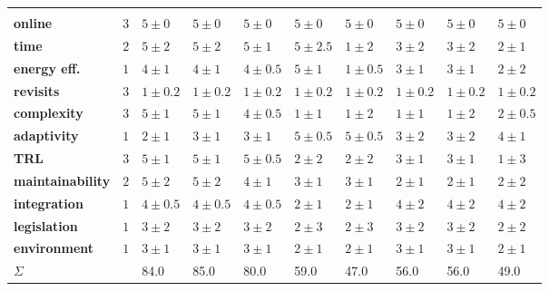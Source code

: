 {
\noindent
{}
\begin{tabu}{X[7,r,m] X[1,cm] X[3,c,m] X[3,c,m] X[3,c,m] X[3,c,m] X[3,c,m] X[3,c,m] X[3,c,m] X[3,c,m]}
 \rowfont{\sffamily\bfseries\color{RoyalWhite}}
  \color{RoyalWhite} & \color{RoyalWhite}  & \color{RoyalWhite}  & \color{RoyalWhite}  & \color{RoyalWhite}  & \color{RoyalWhite}  & \color{RoyalWhite}  & \color{RoyalWhite}  & \color{RoyalWhite}  & \color{RoyalWhite} \\
  \textbf{online} & \(3\) & \(5 \pm 0\) & \(5 \pm 0\) & \(5 \pm 0\) & \(5 \pm 0\) & \(5 \pm 0\) & \(5 \pm 0\) & \(5 \pm 0\) & \(5 \pm 0\)\\
  \textbf{time} & \(2\) & \(5 \pm 2\) & \(5 \pm 2\) & \(5 \pm 1\) & \(5 \pm 2.5\) & \(1 \pm 2\) & \(3 \pm 2\) & \(3 \pm 2\) & \(2 \pm 1\)\\
  \textbf{energy eff.} & \(1\) & \(4 \pm 1\) & \(4 \pm 1\) & \(4 \pm 0.5\) & \(5 \pm 1\) & \(1 \pm 0.5\) & \(3 \pm 1\) & \(3 \pm 1\) & \(2 \pm 2\)\\
  \textbf{revisits} & \(3\) & \(1 \pm 0.2\) & \(1 \pm 0.2\) & \(1 \pm 0.2\) & \(1 \pm 0.2\) & \(1 \pm 0.2\) & \(1 \pm 0.2\) & \(1 \pm 0.2\) & \(1 \pm 0.2\)\\
  \textbf{complexity} & \(3\) & \(5 \pm 1\) & \(5 \pm 1\) & \(4 \pm 0.5\) & \(1 \pm 1\) & \(1 \pm 2\) & \(1 \pm 1\) & \(1 \pm 2\) & \(2 \pm 0.5\)\\
  \textbf{adaptivity} & \(1\) & \(2 \pm 1\) & \(3 \pm 1\) & \(3 \pm 1\) & \(5 \pm 0.5\) & \(5 \pm 0.5\) & \(3 \pm 2\) & \(3 \pm 2\) & \(4 \pm 1\)\\
  \textbf{TRL} & \(3\) & \(5 \pm 1\) & \(5 \pm 1\) & \(5 \pm 0.5\) & \(2 \pm 2\) & \(2 \pm 2\) & \(3 \pm 1\) & \(3 \pm 1\) & \(1 \pm 3\)\\
  \textbf{maintainability} & \(2\) & \(5 \pm 2\) & \(5 \pm 2\) & \(4 \pm 1\) & \(3 \pm 1\) & \(3 \pm 1\) & \(2 \pm 1\) & \(2 \pm 1\) & \(2 \pm 2\)\\
  \textbf{integration} & \(1\) & \(4 \pm 0.5\) & \(4 \pm 0.5\) & \(4 \pm 0.5\) & \(2 \pm 1\) & \(2 \pm 1\) & \(4 \pm 2\) & \(4 \pm 2\) & \(4 \pm 2\)\\
  \textbf{legislation} & \(1\) & \(3 \pm 2\) & \(3 \pm 2\) & \(3 \pm 2\) & \(2 \pm 3\) & \(2 \pm 3\) & \(3 \pm 2\) & \(3 \pm 2\) & \(2 \pm 2\)\\
  \textbf{environment} & \(1\) & \(3 \pm 1\) & \(3 \pm 1\) & \(3 \pm 1\) & \(2 \pm 1\) & \(2 \pm 1\) & \(3 \pm 1\) & \(3 \pm 1\) & \(2 \pm 1\)\\
 \rowfont{\sffamily\bfseries\color{RoyalWhite}}
  \color{RoyalWhite} \(\Sigma\) & &  \color{RoyalWhite} 84.0 &  \color{RoyalWhite} 85.0 &  \color{RoyalWhite} 80.0 &  \color{RoyalWhite} 59.0 &  \color{RoyalWhite} 47.0 &  \color{RoyalWhite} 56.0 &  \color{RoyalWhite} 56.0 &  \color{RoyalWhite} 49.0 
\end{tabu}
}
